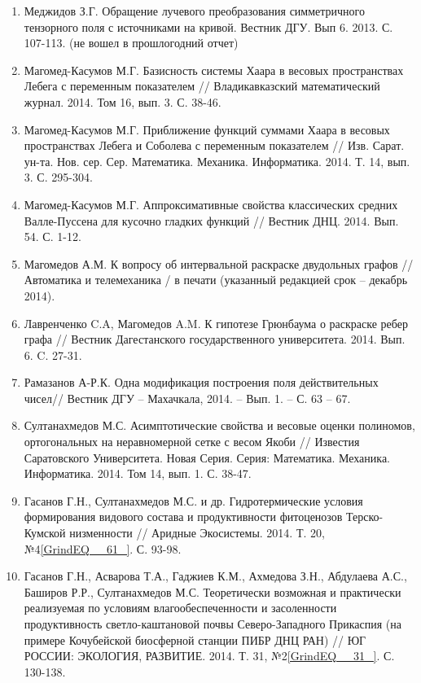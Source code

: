 \documentclass{article}
\begin{document}
\begin{enumerate}
\item  Меджидов З.Г. Обращение лучевого преобразования симметричного тензорного поля с источниками на кривой. Вестник ДГУ. Вып 6. 2013. С. 107-113. (не вошел в прошлогодний отчет)

\item  Магомед-Касумов М.Г. Базисность системы Хаара в весовых пространствах Лебега с переменным показателем // Владикавказский математический журнал. 2014. Том 16, вып. 3. С. 38-46.

\item  Магомед-Касумов М.Г. Приближение функций суммами Хаара в весовых пространствах Лебега и Соболева с переменным показателем // Изв. Сарат. ун-та. Нов. сер. Сер. Математика. Механика. Информатика. 2014. Т. 14, вып. 3. С. 295-304.

\item  Магомед-Касумов М.Г. Аппроксимативные свойства классических средних Валле-Пуссена для кусочно гладких функций // Вестник ДНЦ. 2014. Вып. 54. С. 1-12.

\item  Магомедов А.М. К вопросу об интервальной раскраске двудольных графов // Автоматика и телемеханика / в печати (указанный редакцией срок -- декабрь 2014).

\item  Лавренченко C.A, Магомедов A.M. К гипотезе Грюнбаума о раскраске ребер графа // Вестник Дагестанского государственного университета. 2014. Вып. 6. C. 27-31.

\item  Рамазанов А-Р.К. Одна модификация построения поля действительных чисел// Вестник ДГУ -- Махачкала, 2014. -- Вып. 1. -- С. 63 -- 67.

\item  Султанахмедов М.С. Асимптотические свойства и весовые оценки полиномов, ортогональных на неравномерной сетке с весом Якоби // Известия Саратовского Университета. Новая Серия. Серия: Математика. Механика. Информатика. 2014. Том 14, вып. 1. С. 38-47.

\item  Гасанов Г.Н., Султанахмедов М.С. и др. Гидротермические условия формирования видового состава и продуктивности фитоценозов Терско-Кумской низменности // Аридные Экосистемы. 2014. Т. 20, №4\eqref{GrindEQ__61_}. С. 93-98.

\item  Гасанов Г.Н., Асварова Т.А., Гаджиев К.М., Ахмедова З.Н., Абдулаева А.С., Баширов Р.Р., Султанахмедов М.С. Теоретически возможная и практически реализуемая по условиям влагообеспеченности и засоленности продуктивность светло-каштановой почвы Северо-Западного Прикаспия (на примере Кочубейской биосферной станции ПИБР ДНЦ РАН) // ЮГ РОССИИ: ЭКОЛОГИЯ, РАЗВИТИЕ. 2014. Т. 31, №2\eqref{GrindEQ__31_}. С. 130-138.


\end{enumerate}
\end{document}

